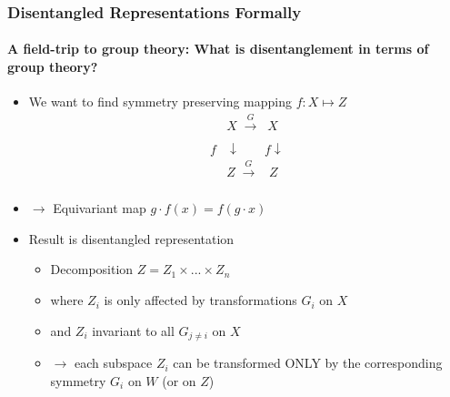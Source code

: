 \documentclass[9pt]{beamer}
\begin{document}
\begin{frame}
\frametitle{Disentangled Representations Formally}
\framesubtitle{A field-trip to group theory: What is disentanglement in terms of group theory?}
\begin{itemize}%
	\item We want to find symmetry preserving mapping $f:X \mapsto Z$
	\begin{align*}
		&X \;\xrightarrow[\text{}]{G}\;\;X\\ 
		f&\downarrow \;\;\;\;\;\;\;f\downarrow\\
		&Z \;\xrightarrow[\text{}]{G}\;\;\;Z
	\end{align*}
	\item $\rightarrow$ Equivariant map $g \cdot f(x) = f(g\cdot x)$
	\item Result is disentangled representation
	\begin{itemize}
		\item Decomposition $Z = Z_{1} \times ... \times Z_{n}$
		\item where $Z_{i}$ is only affected by transformations $G_i$ on $X$%
		\item and $Z_i$ invariant to all $G_{j \neq i}$ on $X$ %
		\item $\rightarrow$ each subspace $Z_i$ can be transformed ONLY by the corresponding symmetry $G_i$ on $W$ (or on $Z$)%
	\end{itemize}
\end{itemize}
\end{frame} 
\end{document}
